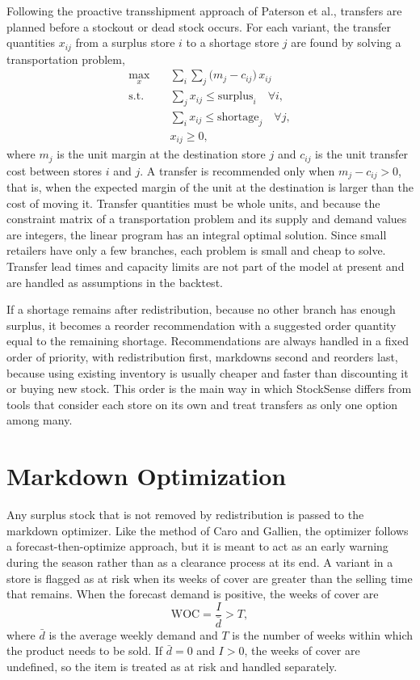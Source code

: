 \documentclass{StockSense}
\begin{document}
Following the proactive transshipment approach of Paterson et al., transfers are planned before a stockout or dead stock occurs. For each variant, the transfer quantities $x_{ij}$ from a surplus store $i$ to a shortage store $j$ are found by solving a transportation problem,
\begin{align}
    \max_{x}\quad & \sum_{i}\sum_{j} \big(m_j - c_{ij}\big)\, x_{ij} \\
    \text{s.t.}\quad & \sum_{j} x_{ij} \le \text{surplus}_i \quad \forall i, \\
    & \sum_{i} x_{ij} \le \text{shortage}_j \quad \forall j, \\
    & x_{ij} \ge 0,
\end{align}
where $m_j$ is the unit margin at the destination store $j$ and $c_{ij}$ is the unit transfer cost between stores $i$ and $j$. A transfer is recommended only when $m_j - c_{ij} > 0$, that is, when the expected margin of the unit at the destination is larger than the cost of moving it. Transfer quantities must be whole units, and because the constraint matrix of a transportation problem and its supply and demand values are integers, the linear program has an integral optimal solution. Since small retailers have only a few branches, each problem is small and cheap to solve. Transfer lead times and capacity limits are not part of the model at present and are handled as assumptions in the backtest.

If a shortage remains after redistribution, because no other branch has enough surplus, it becomes a reorder recommendation with a suggested order quantity equal to the remaining shortage. Recommendations are always handled in a fixed order of priority, with redistribution first, markdowns second and reorders last, because using existing inventory is usually cheaper and faster than discounting it or buying new stock. This order is the main way in which StockSense differs from tools that consider each store on its own and treat transfers as only one option among many.

\section{Markdown Optimization}
\label{sec:markdown}

Any surplus stock that is not removed by redistribution is passed to the markdown optimizer. Like the method of Caro and Gallien, the optimizer follows a forecast-then-optimize approach, but it is meant to act as an early warning during the season rather than as a clearance process at its end. A variant in a store is flagged as at risk when its weeks of cover are greater than the selling time that remains. When the forecast demand is positive, the weeks of cover are
\begin{equation}
    \mathrm{WOC} = \frac{I}{\bar{d}} > T,
\end{equation}
where $\bar{d}$ is the average weekly demand and $T$ is the number of weeks within which the product needs to be sold. If $\bar{d}=0$ and $I>0$, the weeks of cover are undefined, so the item is treated as at risk and handled separately.
\end{document}
